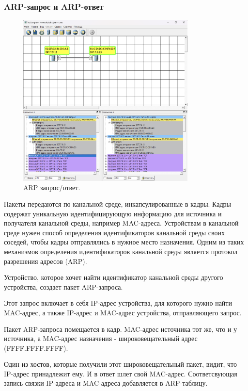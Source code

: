 \documentclass[12pt,onecolumn]{article}
\begin{document}
\subsubsection{ARP-запрос и ARP-ответ}
\begin{figure}[H]
  \centering
  \includegraphics[width=0.8\textwidth]{image/arp-req-resp.png}
  \caption{ARP запрос/ответ.}
\end{figure}
Пакеты передаются по канальной среде, инкапсулированные в кадры. Кадры содержат уникальную идентифицирующую информацию для источника и получателя канальной среды, например MAC-адреса. Устройствам в канальной среде нужен способ определения идентификаторов канальной среды своих соседей, чтобы кадры отправлялись в нужное место назначения. Одним из таких механизмов определения идентификаторов канальной среды является протокол разрешения адресов (ARP).

Устройство, которое хочет найти идентификатор канальной среды другого устройства, создает пакет ARP-запроса. 

Этот запрос включает в себя IP-адрес устройства, для которого нужно найти MAC-адрес,
а также IP-адрес и MAC-адрес устройства, отправляющего запрос.

Пакет ARP-запроса помещается в кадр. MAC-адрес источника тот же, что и у источника, а MAC-адрес назначения - широковещательный адрес (FFFF.FFFF.FFFF).

Один из хостов, которые получили этот широковещательный пакет, видит, что IP-адрес принадлежит ему. И в ответ шлет свой MAC-адрес.
Соответсвующая запись связки IP-адреса и MAC-адреса добавляется в ARP-таблицу.
\end{document}
